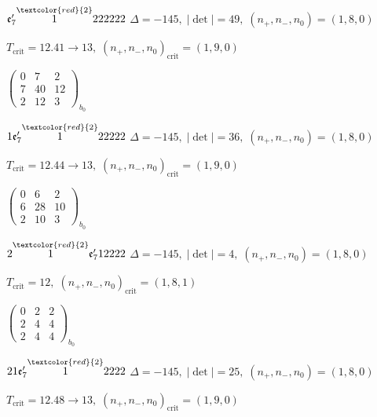 \documentclass[10pt]{article}
\begin{document}
\smallskip

$\mathfrak{e}_7'\overset{\textcolor{red}{2}}{1}222222$ \quad $\Delta=-145,\; |\det|=49,\; (n_+,n_-,n_0)=(1,8,0)$

\hspace{1em}$T_{\text{crit}}=12.41 \to 13,\; (n_+,n_-,n_0)_{\text{crit}}=(1,9,0)$

\hspace{2em}$\left(\begin{smallmatrix}0 & 7 & 2 \\ 7 & 40 & 12 \\ 2 & 12 & 3\end{smallmatrix}\right)_{\!b_0}$

\smallskip

$1\mathfrak{e}_7'\overset{\textcolor{red}{2}}{1}22222$ \quad $\Delta=-145,\; |\det|=36,\; (n_+,n_-,n_0)=(1,8,0)$

\hspace{1em}$T_{\text{crit}}=12.44 \to 13,\; (n_+,n_-,n_0)_{\text{crit}}=(1,9,0)$

\hspace{2em}$\left(\begin{smallmatrix}0 & 6 & 2 \\ 6 & 28 & 10 \\ 2 & 10 & 3\end{smallmatrix}\right)_{\!b_0}$

\smallskip

$2\overset{\textcolor{red}{2}}{1}\mathfrak{e}_7'12222$ \quad $\Delta=-145,\; |\det|=4,\; (n_+,n_-,n_0)=(1,8,0)$

\hspace{1em}$T_{\text{crit}}=12,\; (n_+,n_-,n_0)_{\text{crit}}=(1,8,1)$

\hspace{2em}$\left(\begin{smallmatrix}0 & 2 & 2 \\ 2 & 4 & 4 \\ 2 & 4 & 4\end{smallmatrix}\right)_{\!b_0}$

$21\mathfrak{e}_7'\overset{\textcolor{red}{2}}{1}2222$ \quad $\Delta=-145,\; |\det|=25,\; (n_+,n_-,n_0)=(1,8,0)$

\hspace{1em}$T_{\text{crit}}=12.48 \to 13,\; (n_+,n_-,n_0)_{\text{crit}}=(1,9,0)$
\end{document}
